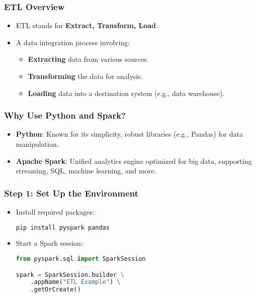 \documentclass[aspectratio=169]{beamer}
\begin{document}
\begin{frame}
    \titlepage
\end{frame}

\begin{frame}
    \frametitle{ETL Overview}
    \begin{itemize}
        \item ETL stands for \textbf{Extract, Transform, Load}.
        \item A data integration process involving:
        \begin{itemize}
            \item \textbf{Extracting} data from various sources.
            \item \textbf{Transforming} the data for analysis.
            \item \textbf{Loading} data into a destination system (e.g., data warehouse).
        \end{itemize}
    \end{itemize}
\end{frame}

\begin{frame}
    \frametitle{Why Use Python and Spark?}
    \begin{itemize}
        \item \textbf{Python}: Known for its simplicity, robust libraries (e.g., Pandas) for data manipulation.
        \item \textbf{Apache Spark}: Unified analytics engine optimized for big data, supporting streaming, SQL, machine learning, and more.
    \end{itemize}
\end{frame}

\begin{frame}[fragile]
    \frametitle{Step 1: Set Up the Environment}
    \begin{itemize}
        \item Install required packages:
        \begin{lstlisting}[language=bash]
pip install pyspark pandas
        \end{lstlisting}
        \item Start a Spark session:
        \begin{lstlisting}[language=python]
from pyspark.sql import SparkSession

spark = SparkSession.builder \
    .appName("ETL Example") \
    .getOrCreate()
        \end{lstlisting}
    \end{itemize}
\end{frame}
\end{document}
